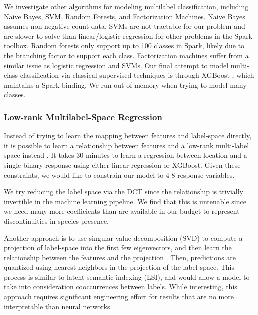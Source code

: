 We investigate other algorithms for modeling multilabel classification, including Naive Bayes, SVM, Random Forests, and Factorization Machines.
Naive Bayes assumes non-negative count data. 
SVMs are not tractable for our problem and are slower to solve than linear/logistic regression for other problems in the Spark toolbox. 
Random forests only support up to 100 classes in Spark, likely due to the branching factor to support each class. 
Factorization machines suffer from a similar issue as logistic regression and SVMs. 
Our final attempt to model multi-class classification via classical supervised techniques is through XGBoost \cite{chen2016xgboost}, which maintains a Spark binding. 
We run out of memory when trying to model many classes. 


\subsubsection{Low-rank Multilabel-Space Regression}

Instead of trying to learn the mapping between features and label-space directly, it is possible to learn a relationship between features and a low-rank multi-label space instead \cite{dasgupta2023review}.
It takes 30 minutes to learn a regression between location and a single binary response using either linear regression or XGBoost.
Given these constraints, we would like to constrain our model to 4-8 response variables. 

We try reducing the label space via the DCT since the relationship is trivially invertible in the machine learning pipeline. 
We find that this is untenable since we need many more coefficients than are available in our budget to represent discontinuities in species presence.


Another approach is to use singular value decomposition (SVD) to compute a projection of label-space into the first few eigenvectors, and then learn the relationship between the features and the projection \cite{tai2012multilabel}.
Then, predictions are quantized using nearest neighbors in the projection of the label space.
This process is similar to latent semantic indexing (LSI), and would allow a model to take into consideration cooccurrences between labels. 
While interesting, this approach requires significant engineering effort for results that are no more interpretable than neural networks.

